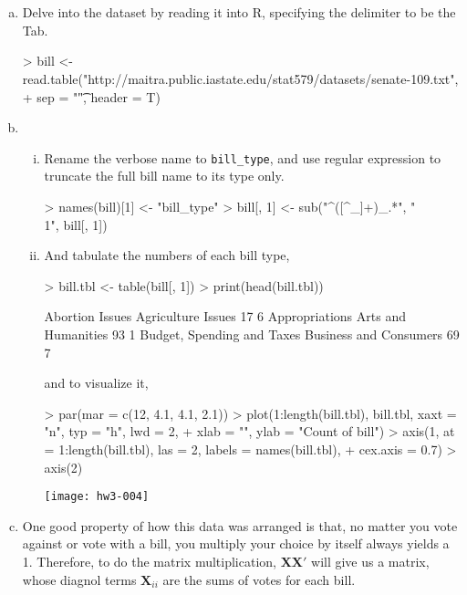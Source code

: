 \documentclass{article}
\begin{document}
    \section{}
    \begin{enumerate}[(a)]
    \item
    Delve into the dataset by reading it into R, specifying the delimiter to be the Tab. 
\begin{Schunk}
\begin{Sinput}
> bill <- read.table("http://maitra.public.iastate.edu/stat579/datasets/senate-109.txt", 
+     sep = "\t", header = T)
\end{Sinput}
\end{Schunk}
    \item 

    \begin{enumerate}[i.]
    \item
    Rename the verbose name to \verb=bill_type=, and use regular expression to truncate the full bill name to its type only. 
\begin{Schunk}
\begin{Sinput}
> names(bill)[1] <- "bill_type"
> bill[, 1] <- sub("^([^_]+)_.*", "\\1", bill[, 1])
\end{Sinput}
\end{Schunk}
    \item
    And tabulate the numbers of each bill type,
\begin{Schunk}
\begin{Sinput}
> bill.tbl <- table(bill[, 1])
> print(head(bill.tbl))
\end{Sinput}
\begin{Soutput}
           Abortion Issues         Agriculture Issues 
                        17                          6 
            Appropriations        Arts and Humanities 
                        93                          1 
Budget, Spending and Taxes     Business and Consumers 
                        69                          7 
\end{Soutput}
\end{Schunk}
    and to visualize it,
\begin{Schunk}
\begin{Sinput}
> par(mar = c(12, 4.1, 4.1, 2.1))
> plot(1:length(bill.tbl), bill.tbl, xaxt = "n", typ = "h", lwd = 2, 
+     xlab = "", ylab = "Count of bill")
> axis(1, at = 1:length(bill.tbl), las = 2, labels = names(bill.tbl), 
+     cex.axis = 0.7)
> axis(2)
\end{Sinput}
\end{Schunk}
\texttt{[image: hw3-004]}
    \end{enumerate}
    \item One good property of how this data was arranged is that, no matter you vote against or vote with a bill, you multiply your choice by itself always yields a 1. 
    Therefore, to do the matrix multiplication, $\mathbf{XX}'$
    will give us a matrix, whose diagnol terms $\mathbf{X}_{ii}$ are the sums of votes for each bill.


\end{enumerate}
\end{document}
